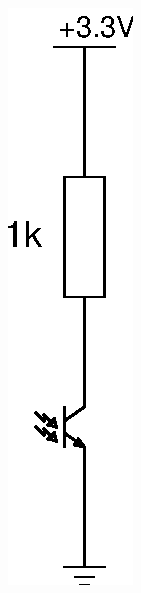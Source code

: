 \documentclass{article}
\begin{document}
\begin{figure}[h]
\centering
\includegraphics[width=.5\textwidth]{assets/fig/schem/ir-pt}
\label{fig:schem:ir-pt}
\end{figure}
\end{document}
